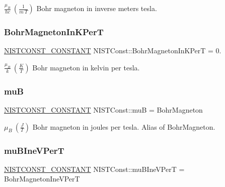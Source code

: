 $\frac{\mu_B}{hc} \ (\frac{1}{m\ T})$ Bohr magneton in inverse meters tesla. \mbox{\label{group___n_i_s_t_const-_bohr_magneton_gab847d7f91c3980277d352fd100d904f2}} 
\subsubsection{\texorpdfstring{Bohr\+Magneton\+In\+K\+PerT}{BohrMagnetonInKPerT}}
{\footnotesize\ttfamily \mbox{\hyperlink{group___n_i_s_t_const-_macros_ga2b0fc1d7452373f816175dd86ce26729}{N\+I\+S\+T\+C\+O\+N\+S\+T\+\_\+\+C\+O\+N\+S\+T\+A\+NT}} N\+I\+S\+T\+Const\+::\+Bohr\+Magneton\+In\+K\+PerT = 0.}

$\frac{\mu_B}{k} \ (\frac{K}{T})$ Bohr magneton in kelvin per tesla. \mbox{\label{group___n_i_s_t_const-_bohr_magneton_ga0bd5a832149b6389c0f2acc2d7894144}} 
\subsubsection{\texorpdfstring{muB}{muB}}
{\footnotesize\ttfamily \mbox{\hyperlink{group___n_i_s_t_const-_macros_ga2b0fc1d7452373f816175dd86ce26729}{N\+I\+S\+T\+C\+O\+N\+S\+T\+\_\+\+C\+O\+N\+S\+T\+A\+NT}} N\+I\+S\+T\+Const\+::muB = Bohr\+Magneton}

$\mu_B \ (\frac{J}{T})$ Bohr magneton in joules per tesla. Alias of Bohr\+Magneton. \mbox{\label{group___n_i_s_t_const-_bohr_magneton_gac0165514adb8e7249ee914b3f474a744}} 
\subsubsection{\texorpdfstring{mu\+B\+Ine\+V\+PerT}{muBIneVPerT}}
{\footnotesize\ttfamily \mbox{\hyperlink{group___n_i_s_t_const-_macros_ga2b0fc1d7452373f816175dd86ce26729}{N\+I\+S\+T\+C\+O\+N\+S\+T\+\_\+\+C\+O\+N\+S\+T\+A\+NT}} N\+I\+S\+T\+Const\+::mu\+B\+Ine\+V\+PerT = Bohr\+Magneton\+Ine\+V\+PerT}

